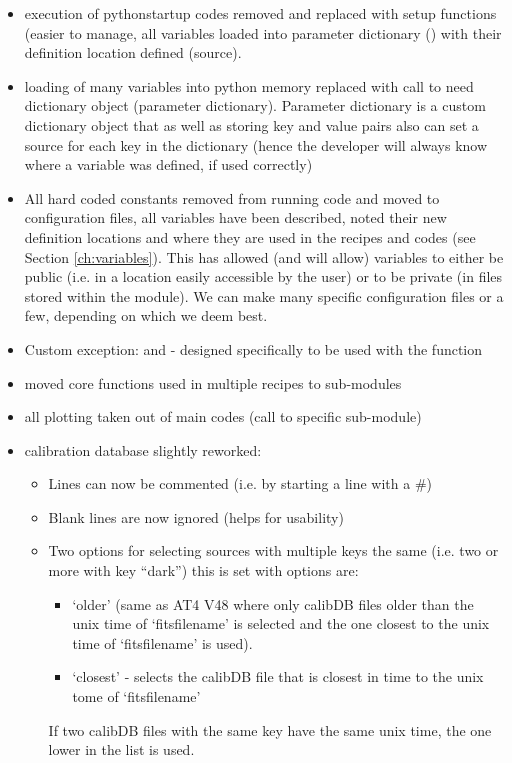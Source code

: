 \begin{itemize}
\begin{itemize}
	\end{itemize}
\item execution of pythonstartup codes removed and replaced with setup functions (easier to manage, all variables loaded into parameter dictionary (\ParamDict) with their definition location defined (source).

\item loading of many variables into python memory replaced with call to need dictionary object (parameter dictionary). Parameter dictionary is a custom dictionary object that as well as storing key and value pairs also can set a source for each key in the dictionary (hence the developer will always know where a variable was defined, if used correctly)

\item All hard coded constants removed from running code and moved to configuration files, all variables have been described, noted their new definition locations and where they are used in the recipes and codes (see Section \ref{ch:variables}). This has allowed (and will allow) variables to either be public (i.e. in a location easily accessible by the user) or to be private (in files stored within the module). We can make many specific configuration files or a few, depending on which we deem best.

\item Custom exception: \ConfigError and  - designed specifically to be used with the \WLOG function 

\item moved core functions used in multiple recipes to sub-modules

\item all plotting taken out of main codes (call to specific sub-module)

\item calibration database slightly reworked:

\begin{itemize}
	\item Lines can now be commented (i.e. by starting a line with a \#)
	\item Blank lines are now ignored (helps for usability)
	\item Two options for selecting sources with multiple keys the same (i.e. two or more with key ``dark'') this is set with  options are:

	\begin{itemize}
		\item `older' (same as AT4 V48 where only calibDB files older than the unix time of `fitsfilename' is selected and the one closest to the unix time of `fitsfilename' is used).
		\item `closest' - selects the calibDB file that is closest in time to the unix tome of `fitsfilename'
	\end{itemize}
	\begin{note}
	If two calibDB files with the same key have the same unix time, the one lower in the list is used.
	\end{note}


\end{itemize}
\end{itemize}
